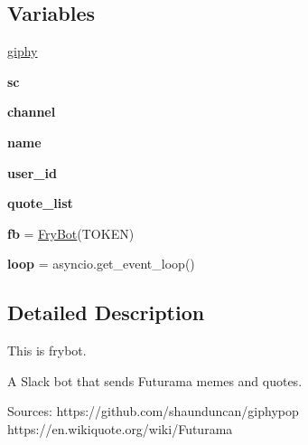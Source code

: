 \subsection*{Variables}
\begin{DoxyCompactItemize}
\item 
\hyperlink{namespacelelbot_a0bda6b974c98e4f96abf97e426f18d16}{giphy}
\item 
{\bfseries sc}\hypertarget{namespacelelbot_ab0f51083cf9e0647e45ed8130d1b2e01}{}\label{namespacelelbot_ab0f51083cf9e0647e45ed8130d1b2e01}

\item 
{\bfseries channel}\hypertarget{namespacelelbot_acb6de0e498f124ef663a8d8e9e884852}{}\label{namespacelelbot_acb6de0e498f124ef663a8d8e9e884852}

\item 
{\bfseries name}\hypertarget{namespacelelbot_a09df6822c4c1fcf90c33247e2c54d099}{}\label{namespacelelbot_a09df6822c4c1fcf90c33247e2c54d099}

\item 
{\bfseries user\+\_\+id}\hypertarget{namespacelelbot_a0657d1c83b48e8aab59e11c73c1b509c}{}\label{namespacelelbot_a0657d1c83b48e8aab59e11c73c1b509c}

\item 
{\bfseries quote\+\_\+list}\hypertarget{namespacelelbot_a151b6e7366829397eb60933c1c685453}{}\label{namespacelelbot_a151b6e7366829397eb60933c1c685453}

\item 
{\bfseries fb} = \hyperlink{classlelbot_1_1_fry_bot}{Fry\+Bot}(T\+O\+K\+EN)\hypertarget{namespacelelbot_a01ef22f519c4e80b871fc604fb1b3be1}{}\label{namespacelelbot_a01ef22f519c4e80b871fc604fb1b3be1}

\item 
{\bfseries loop} = asyncio.\+get\+\_\+event\+\_\+loop()\hypertarget{namespacelelbot_a653a5a0c00aa8aebeba824bd33d71e1f}{}\label{namespacelelbot_a653a5a0c00aa8aebeba824bd33d71e1f}

\end{DoxyCompactItemize}


\subsection{Detailed Description}
\begin{DoxyVerb}This is frybot.

A Slack bot that sends Futurama memes and quotes.

Sources:
https://github.com/shaunduncan/giphypop
https://en.wikiquote.org/wiki/Futurama
\end{DoxyVerb}
 

